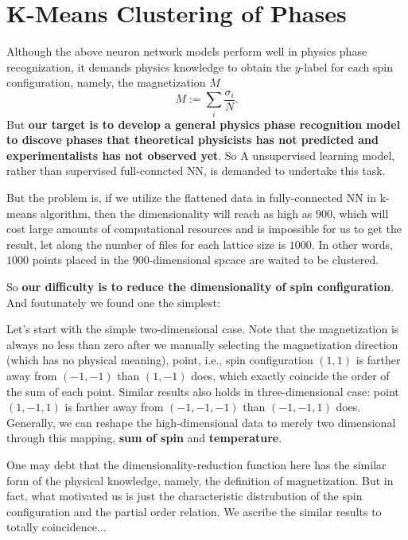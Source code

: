 \documentclass[prl,aps,twocolumn]{revtex4}
\begin{document}
\section{K-Means Clustering of Phases}
	Although the above neuron network models perform well in physics phase recognization, it demands physics knowledge to obtain the $y$-label for each spin configuration, namely, the magnetization $M$
	\begin{equation}
		M:=\sum_i\dfrac{\sigma_i}{N}.
	\end{equation}
	But \textbf{our target is to develop a general physics phase recognition model to discove phases that theoretical physicists has not predicted and experimentalists has not observed yet}. So A unsupervised learning model, rather than supervised full-conncted NN, is demanded to undertake this task.\par
	But the problem is, if we utilize the flattened data in fully-connected NN in k-means algorithm, then the dimensionality will reach as high as $900$, which will cost large amounts of computational resources and is impossible for us to get the result, let along the number of files for each lattice size is $1000$. In other words, $1000$ points placed in the $900$-dimensional spcace are waited to be clustered.\par
	\hfill\par
	So \textbf{our difficulty is to reduce the dimensionality of spin configuration}. And foutunately we found one the simplest: \par
	Let's start with the simple two-dimensional case. Note that the magnetization is always no less than zero after we manually selecting the magnetization direction (which has no physical meaning), point, i.e., spin configuration $(1,1)$ is farther away from $(-1,-1)$ than $(1,-1)$ does, which exactly coincide the order of the sum of each point. Similar results also holds in three-dimensional case: point $(1,-1,1)$ is farther away from $(-1,-1,-1)$ than $(-1,-1,1)$ does. Generally, we can reshape the high-dimensional data to merely two dimensional through this mapping, \textbf{sum of spin} and \textbf{temperature}.\par
	One may debt that the dimensionality-reduction function here has the similar form of the physical knowledge, namely, the definition of magnetization. But in fact, what motivated us is just the characteristic distrubution of the spin configuration and the partial order relation. We ascribe the similar results to totally coincidence...\par
\end{document}

